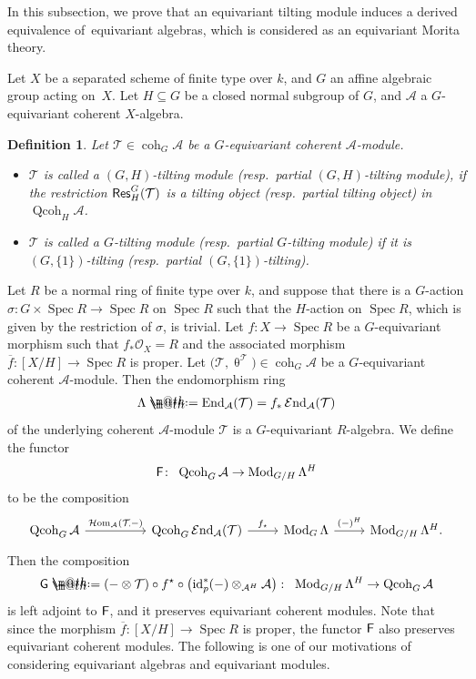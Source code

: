 \documentclass[pdftex]{sigma}%
\makeatletter
\newtheorem{dfn}{Definition}[section]
\newcommand*{\defeq}{\mathrel{\rlap{%
 \raisebox{0.3ex}{$\m@th\cdot$}}%
 \raisebox{-0.3ex}{$\m@th\cdot$}}%
 =}
\numberwithin{equation}{section}
\newcommand{\Spec}{\operatorname{Spec}}
\newcommand{\cHom}{\operatorname{{\mathcal H}om}}
\newcommand{\End}{\operatorname{End}}
\newcommand{\cEnd}{\operatorname{{\mathcal E}nd}}
\newcommand{\coh}{\operatorname{coh}}
\newcommand{\Qcoh}{\operatorname{Qcoh}}
\newcommand{\Mod}{\operatorname{Mod}}
\newcommand{\id}{\operatorname{id}}
\newcommand{\Res}{\operatorname{\sf Res}}
\newcommand{\cA}{\mathcal{A}}
\newcommand{\cO}{\mathcal{O}}
\newcommand{\cT}{\mathcal{T}}
\newcommand{\F}{\operatorname{\sf{F}}}
\newcommand{\G}{\operatorname{\sf{G}}}
\makeatother
\begin{document}
In this subsection, we prove that an equivariant tilting module induces a derived equivalence of~equivariant algebras, which is considered as an equivariant Morita theory.

Let $X$ be a separated scheme of finite type over $k$, and $G$ an affine algebraic group acting on~$X$.
Let $H\subseteq G$ be a closed normal subgroup of $G$, and $\cA$ a $G$-equivariant coherent $X$-algebra.

\begin{dfn}
Let $\cT\in \coh_G\cA$ be a $G$-equivariant coherent $\cA$-module.
\begin{itemize}\itemsep=0pt
\item[1.] $\cT$ is called a {\it $(G,H)$-tilting module} (resp.\ {\it partial $(G,H)$-tilting module}), if the restriction $\Res^G_H(\cT)$ is a tilting object (resp.\ partial tilting object) in $\Qcoh_H\cA$.
\item[2.] $\cT$ is called a {\it $G$-tilting module} (resp.\ {\it partial $G$-tilting module}) if it is $(G,\{1\})$-tilting (resp.\ partial $(G,\{1\})$-tilting).
\end{itemize}
\end{dfn}
Let $R$ be a normal ring of finite type over $k$, and suppose that there is a $G$-action $\sigma\colon G\times \Spec R\to \Spec R$ on $\Spec R$ such that the $H$-action on $\Spec R$, which is given by the restriction of $\sigma$, is trivial. Let $f\colon X\to \Spec R$ be a $G$-equivariant morphism such that $f_*\cO_X=R$ and the associated morphism $\overline{f}\colon [X/H]\to \Spec R$ is proper. Let $\big(\cT,\uptheta^{\cT}\big)\in \coh_G\cA$ be
a $G$-equivariant coherent $\cA$-module. Then the endomorphism ring
\begin{gather*}
\Lambda\defeq\End_{\cA}(\cT)=f_*\cEnd_{\cA}(\cT)
\end{gather*}
of the underlying coherent $\cA$-module $\cT$ is a $G$-equivariant $R$-algebra.
We define the functor
\begin{gather*}
\F\colon\ \Qcoh_G\cA\to \Mod_{G/H}\Lambda^H
\end{gather*}
to be the composition
\[
\begin{tikzcd}
\Qcoh_G\cA\arrow[rr,"\cHom_{\cA}(\cT\mbox{\hspace{-0.5mm}\tiny ,}-)"]&&\Qcoh_G\cEnd_{\cA}(\cT)\arrow[r,"f_{\star}"]&\Mod_G\Lambda\arrow[r,"(-)^H"]&\Mod_{G/H}\Lambda^H.
\end{tikzcd}
\]
Then the composition
\begin{gather*}
\G\defeq\left(-\otimes \cT\right)\circ f^{\star}\circ \left(\id_p^*(-)\otimes_{\cA^H}\cA\right) \colon\ \Mod_{G/H}\Lambda^H\to \Qcoh_G\cA
\end{gather*}
is left adjoint to $\F$, and it preserves equivariant coherent modules. Note that since the morphism $\overline{f}\colon [X/H]\to \Spec R$ is proper, the functor $\F$ also preserves equivariant coherent modules. The following is one of our motivations of considering equivariant algebras and equivariant modules.
\end{document}
